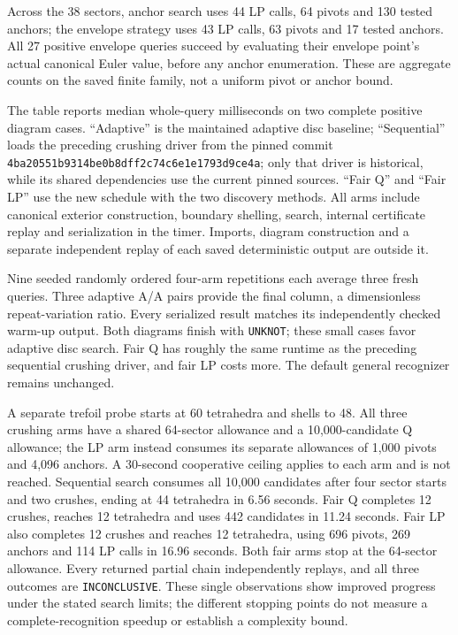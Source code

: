 Across the 38 sectors, anchor search uses 44 LP calls, 64 pivots and 130
tested anchors; the envelope strategy uses 43 LP calls, 63 pivots and 17
tested anchors.  All 27 positive envelope queries succeed by evaluating
their envelope point's actual canonical Euler value, before any anchor
enumeration.  These are aggregate counts on the saved finite family, not
a uniform pivot or anchor bound.

\begin{center}

\end{center}

The table reports median whole-query milliseconds on two complete positive
diagram cases.  ``Adaptive'' is the maintained adaptive disc baseline;
``Sequential'' loads the preceding crushing driver from the pinned commit
\texttt{4ba20551b9314be0b8dff2c74c6e1e1793d9ce4a}; only that driver is
historical, while its shared dependencies use the current pinned sources.
``Fair Q'' and ``Fair LP'' use the new schedule with the two discovery
methods.  All arms include canonical exterior construction, boundary
shelling, search, internal certificate replay and serialization in the
timer.  Imports, diagram construction and a separate independent replay
of each saved deterministic output are outside it.

Nine seeded randomly ordered four-arm repetitions each average three
fresh queries.  Three adaptive A/A pairs provide the final column, a
dimensionless repeat-variation ratio.  Every serialized result matches
its independently checked warm-up output.  Both diagrams finish with
\texttt{UNKNOT}; these small cases favor adaptive disc search.  Fair Q has
roughly the same runtime as the preceding sequential crushing driver,
and fair LP costs more.  The default general recognizer remains unchanged.

A separate trefoil probe starts at 60 tetrahedra and shells to 48.  All
three crushing arms have a shared 64-sector allowance and a 10,000-candidate
Q allowance; the LP arm instead consumes its separate allowances of 1,000
pivots and 4,096 anchors.  A 30-second cooperative ceiling applies to each
arm and is not reached.  Sequential search consumes all 10,000 candidates
after four sector starts and two crushes, ending at 44 tetrahedra in 6.56
seconds.  Fair Q completes 12 crushes, reaches 12 tetrahedra and uses 442
candidates in 11.24 seconds.  Fair LP also completes 12 crushes and reaches
12 tetrahedra, using 696 pivots, 269 anchors and 114 LP calls in 16.96
seconds.  Both fair arms stop at the 64-sector allowance.  Every returned
partial chain independently replays, and all three outcomes are
\texttt{INCONCLUSIVE}.  These single observations show improved progress
under the stated search limits; the different stopping points do not
measure a complete-recognition speedup or establish a complexity bound.

